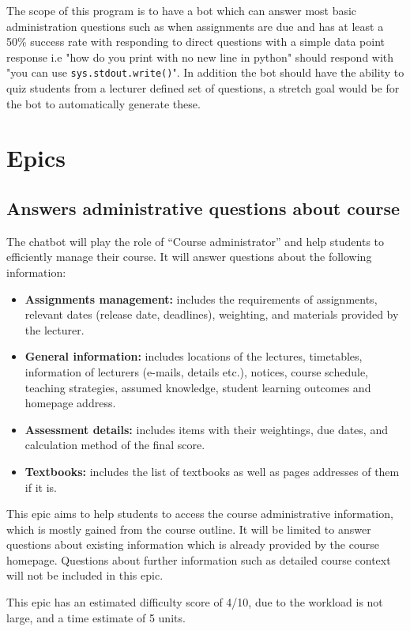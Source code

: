 \documentclass{article}
\begin{document}
The scope of this program is to have a bot which can answer most basic administration questions such as when assignments are due and has at least a 50\% success rate with responding to direct questions with a simple data point response i.e "how do you print with no new line in python" should respond with "you can use \texttt{sys.stdout.write()}". In addition the bot should have the ability to quiz students from a lecturer defined set of questions, a stretch goal would be for the bot to automatically generate these.


\section{Epics}

\subsection{Answers administrative questions about course}

The chatbot will play the role of “Course administrator” and help students to efficiently manage their course. It will answer questions about the following information:
\begin{itemize}
  \item \textbf{Assignments management:} includes the requirements of assignments, relevant dates (release date, deadlines), weighting, and materials provided by the lecturer.
  \item \textbf{General information:} includes locations of the lectures, timetables, information of lecturers (e-mails, details etc.), notices, course schedule, teaching strategies, assumed knowledge, student learning outcomes and homepage address.
  \item \textbf{Assessment details:} includes items with their weightings, due dates, and calculation method of the final score.
  \item \textbf{Textbooks:} includes the list of textbooks as well as pages addresses of them if it is.
\end{itemize}

This epic aims to help students to access the course administrative information, which is mostly gained from the course outline. It will be limited to answer questions about existing information which is already provided by the course homepage. Questions about further information such as detailed course context will not be included in this epic.

This epic has an estimated difficulty score of 4/10, due to the workload is not large, and a time estimate of 5 units.
\end{document}
